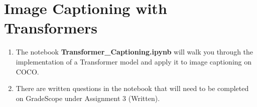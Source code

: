 \section{Image Captioning with Transformers}

\begin{enumerate}
    \item {} The notebook \textbf{Transformer\_Captioning.ipynb} will walk you through the implementation of a Transformer model and apply it to image captioning on COCO.
    \item {} There are written questions in the notebook that will need to be completed on GradeScope under Assignment 3 (Written).
\end{enumerate}